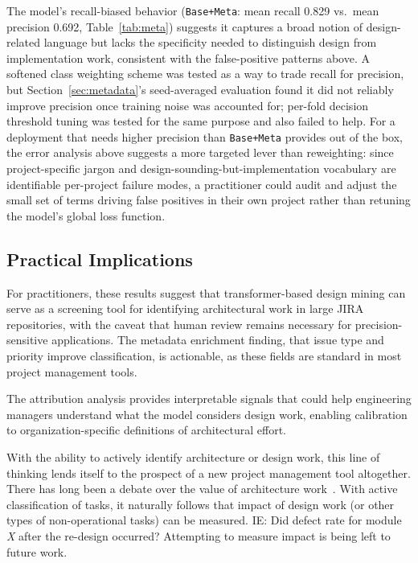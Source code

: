 \documentclass[preprint,12pt]{elsarticle}
\begin{document}
The model's recall-biased behavior (\texttt{Base+Meta}: mean recall 0.829 vs.\ mean precision 0.692, Table~\ref{tab:meta}) suggests it captures a broad notion of design-related language but lacks the specificity needed to distinguish design from implementation work, consistent with the false-positive patterns above. A softened class weighting scheme was tested as a way to trade recall for precision, but Section~\ref{sec:metadata}'s seed-averaged evaluation found it did not reliably improve precision once training noise was accounted for; per-fold decision threshold tuning was tested for the same purpose and also failed to help. For a deployment that needs higher precision than \texttt{Base+Meta} provides out of the box, the error analysis above suggests a more targeted lever than reweighting: since project-specific jargon and design-sounding-but-implementation vocabulary are identifiable per-project failure modes, a practitioner could audit and adjust the small set of terms driving false positives in their own project rather than retuning the model's global loss function.

\subsection{Practical Implications}

For practitioners, these results suggest that transformer-based design mining can serve as a screening tool for identifying architectural work in large JIRA repositories, with the caveat that human review remains necessary for precision-sensitive applications. The metadata enrichment finding, that issue type and priority improve classification, is actionable, as these fields are standard in most project management tools.

The attribution analysis provides interpretable signals that could help engineering managers understand what the model considers design work, enabling calibration to organization-specific definitions of architectural effort.

With the ability to actively identify architecture or design work, this line of thinking lends itself to the prospect of a new project management tool altogether. There has long been a debate over the value of architecture work~\cite{gong2019}. With active classification of tasks, it naturally follows that impact of design work (or other types of non-operational tasks) can be measured. IE: Did defect rate for module \emph{X} after the re-design occurred? Attempting to measure impact is being left to future work.
\end{document}
